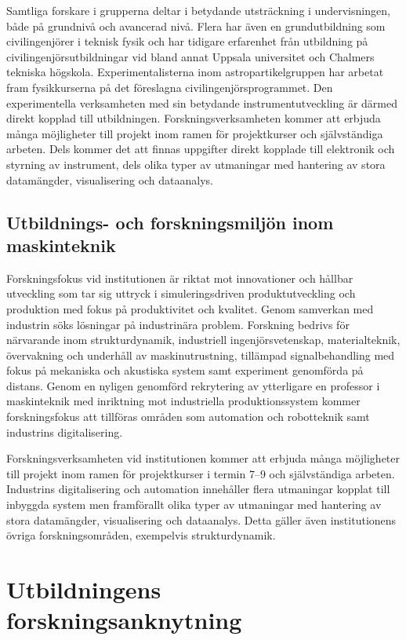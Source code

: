 Samtliga forskare i grupperna deltar i betydande utsträckning i undervisningen, både på grundnivå och avancerad nivå. Flera har även en grundutbildning som civilingenjörer i teknisk fysik och har tidigare erfarenhet från utbildning på civilingenjörsutbildningar vid bland annat Uppsala universitet och Chalmers tekniska högskola. Experimentalisterna inom astropartikelgruppen har arbetat fram fysikkurserna på det föreslagna civilingenjörsprogrammet. Den experimentella verksamheten med sin betydande instrumentutveckling är därmed direkt kopplad till utbildningen. Forskningsverksamheten kommer att erbjuda många möjligheter till projekt inom ramen för projektkurser och självständiga arbeten. Dels kommer det att finnas uppgifter direkt kopplade till elektronik och styrning av instrument, dels olika typer av utmaningar med hantering av stora datamängder, visualisering och dataanalys.

\subsection{Utbildnings- och forskningsmiljön inom maskinteknik}

 Forskningsfokus vid institutionen är riktat mot innovationer och hållbar utveckling som tar sig uttryck i simuleringsdriven produktutveckling och produktion med fokus på produktivitet och kvalitet. Genom samverkan med industrin söks lösningar på industrinära problem. Forskning bedrivs för närvarande inom strukturdynamik, industriell ingenjörsvetenskap, materialteknik, övervakning och underhåll av maskinutrustning, tillämpad signalbehandling med fokus på mekaniska och akustiska system samt experiment genomförda på distans. Genom en nyligen genomförd rekrytering av ytterligare en professor i maskinteknik med inriktning mot industriella produktionssystem kommer forskningsfokus att tillföras områden som automation och robotteknik samt industrins digitalisering.

Forskningsverksamheten vid institutionen kommer att erbjuda många möjligheter till projekt inom ramen för projektkurser i termin 7--9 och självständiga arbeten. Industrins digitalisering och automation innehåller flera utmaningar kopplat till inbyggda system men framförallt olika typer av utmaningar med hantering av stora datamängder, visualisering och dataanalys. Detta gäller även institutionens övriga forskningsområden, exempelvis strukturdynamik.

\section{Utbildningens forskningsanknytning}

